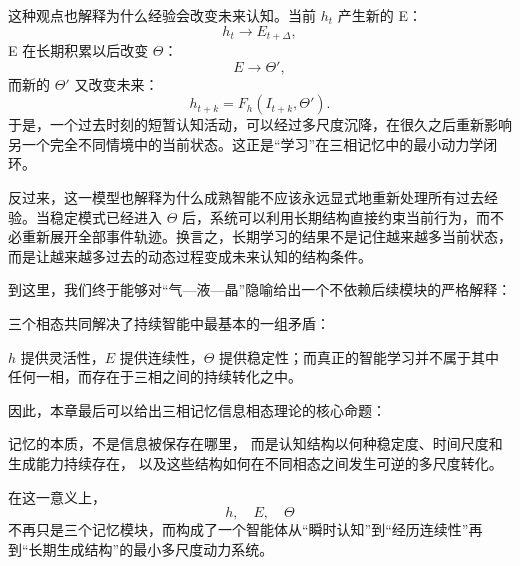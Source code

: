 这种观点也解释为什么经验会改变未来认知。当前 $h_t$ 产生新的 E：
\[
h_t\rightarrow E_{t+\Delta},
\]
E 在长期积累以后改变 $\Theta$：
\[
E\rightarrow\Theta',
\]
而新的 $\Theta'$ 又改变未来：
\[
h_{t+k}
=
F_h
\left(
I_{t+k},\Theta'
\right).
\]
于是，一个过去时刻的短暂认知活动，可以经过多尺度沉降，在很久之后重新影响另一个完全不同情境中的当前状态。这正是“学习”在三相记忆中的最小动力学闭环。

反过来，这一模型也解释为什么成熟智能不应该永远显式地重新处理所有过去经验。当稳定模式已经进入 $\Theta$ 后，系统可以利用长期结构直接约束当前行为，而不必重新展开全部事件轨迹。换言之，长期学习的结果不是记住越来越多当前状态，而是让越来越多过去的动态过程变成未来认知的结构条件。

到这里，我们终于能够对“气—液—晶”隐喻给出一个不依赖后续模块的严格解释：

\begin{statementbox}
\centering
{}
\end{statementbox}

三个相态共同解决了持续智能中最基本的一组矛盾：

\begin{statementbox}
\centering
{}
\end{statementbox}

$h$ 提供灵活性，$E$ 提供连续性，$\Theta$ 提供稳定性；而真正的智能学习并不属于其中任何一相，而存在于三相之间的持续转化之中。

因此，本章最后可以给出三相记忆信息相态理论的核心命题：

\begin{proposition*}
记忆的本质，不是信息被保存在哪里，
而是认知结构以何种稳定度、时间尺度和生成能力持续存在，
以及这些结构如何在不同相态之间发生可逆的多尺度转化。
\end{proposition*}

在这一意义上，
\[
h,\quad E,\quad\Theta
\]
不再只是三个记忆模块，而构成了一个智能体从“瞬时认知”到“经历连续性”再到“长期生成结构”的最小多尺度动力系统。
